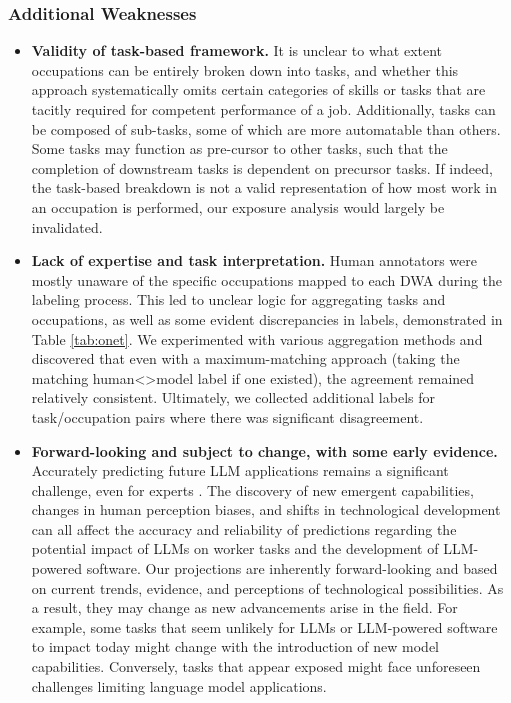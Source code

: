 \documentclass[11pt]{article}
\begin{document}
\subsubsection{Additional Weaknesses}

\begin{itemize}


\item \textbf{Validity of task-based framework.} It is unclear to what extent occupations can be entirely broken down into tasks, and whether this approach systematically omits certain categories of skills or tasks that are tacitly required for competent performance of a job. Additionally, tasks can be composed of sub-tasks, some of which are more automatable than others. Some tasks may function as pre-cursor to other tasks, such that the completion of downstream tasks is dependent on precursor tasks. If indeed, the task-based breakdown is not a valid representation of how most work in an occupation is performed, our exposure analysis would largely be invalidated.



\item \textbf{Lack of expertise and task interpretation.} Human annotators were mostly unaware of the specific occupations mapped to each DWA during the labeling process. This led to unclear logic for aggregating tasks and occupations, as well as some evident discrepancies in labels, demonstrated in Table \ref{tab:onet}. We experimented with various aggregation methods and discovered that even with a maximum-matching approach (taking the matching human<>model label if one existed), the agreement remained relatively consistent. Ultimately, we collected additional labels for task/occupation pairs where there was significant disagreement.

\item \textbf{Forward-looking and subject to change, with some early evidence.} Accurately predicting future LLM applications remains a significant challenge, even for experts \citep{gpt4}. The discovery of new emergent capabilities, changes in human perception biases, and shifts in technological development can all affect the accuracy and reliability of predictions regarding the potential impact of LLMs on worker tasks and the development of LLM-powered software. Our projections are inherently forward-looking and based on current trends, evidence, and perceptions of technological possibilities. As a result, they may change as new advancements arise in the field. For example, some tasks that seem unlikely for LLMs or LLM-powered software to impact today might change with the introduction of new model capabilities. Conversely, tasks that appear exposed might face unforeseen challenges limiting language model applications.


\end{itemize}
\end{document}
